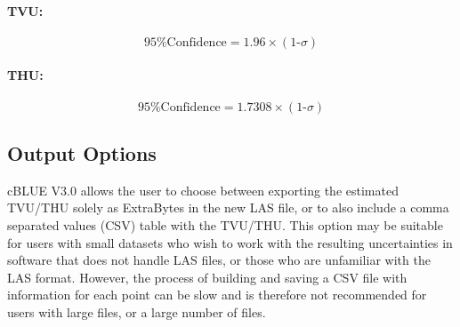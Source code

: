 \documentclass[11pt, a4paper]{article}
\begin{document}
\paragraph{TVU:}
\begin{equation*}
    \text{95\% Confidence} = 1.96 \times (\text{1-$\sigma$})
\end{equation*}

\paragraph{THU:}
\begin{equation*}
    \text{95\% Confidence} = 1.7308 \times (\text{1-$\sigma$})
\end{equation*}

\subsection{Output Options}
cBLUE V3.0 allows the user to choose between exporting the estimated TVU/THU solely as ExtraBytes in the new LAS file, or to also include a comma separated values (CSV) table with the TVU/THU. This option may be suitable for users with small datasets who wish to work with the resulting uncertainties in software that does not handle LAS files, or those who are unfamiliar with the LAS format. However, the process of building and saving a CSV file with information for each point can be slow and is therefore not recommended for users with large files, or a large number of files. 

\vspace{1em}
\end{document}
